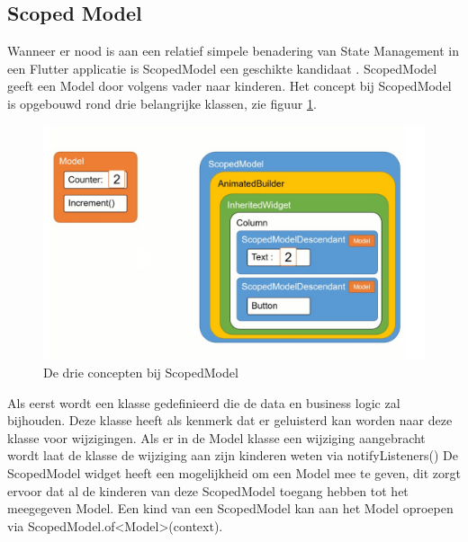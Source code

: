 \subsection{Scoped Model}
Wanneer er nood is aan een relatief simpele benadering van State Management in een Flutter applicatie is ScopedModel een geschikte kandidaat \autocite{Boelens2019}. ScopedModel geeft een Model door volgens vader naar kinderen. Het concept bij ScopedModel is opgebouwd rond drie belangrijke klassen, zie figuur \ref{fig:scopedmodel}. 

\begin{figure}[H]
    \includegraphics[width=\linewidth]{img/stand-van-zaken/scopedmodel.jpg}
    \caption{De drie concepten bij ScopedModel \autocite{Boelens2019}}
    \label{fig:scopedmodel}
\end{figure}
Als eerst wordt een klasse gedefinieerd die de 
data en business logic zal bijhouden. Deze klasse heeft als kenmerk dat er geluisterd kan worden naar deze klasse voor wijzigingen. Als er in de Model klasse een wijziging aangebracht wordt laat de klasse de wijziging aan zijn kinderen weten via notifyListeners()
De ScopedModel widget heeft een mogelijkheid om een Model mee te geven, dit zorgt ervoor dat al de kinderen van deze ScopedModel toegang hebben tot het meegegeven Model. Een kind van een ScopedModel kan aan het Model oproepen via ScopedModel.of<Model>(context).

